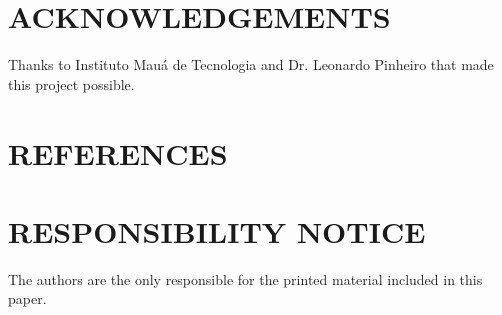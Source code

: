 \documentclass[10pt,fleqn,a4paper,twoside]{article}
\begin{document}
	\section{ACKNOWLEDGEMENTS}
	
	 Thanks to Instituto Mau\'{a} de Tecnologia and Dr. Leonardo Pinheiro that made this project possible.
	
	\section{REFERENCES} 
	
	
	\renewcommand{\refname}{}
	
	
	\section{RESPONSIBILITY NOTICE}
	
	The authors are the only responsible for the printed material included in this paper.
	
\end{document}
